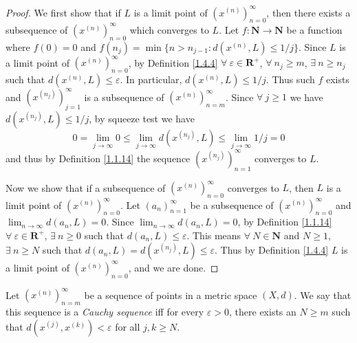 \begin{proof}
    We first show that if \(L\) is a limit point of \((x^{(n)})_{n = 0}^\infty\), then there exists a subsequence of \((x^{(n)})_{n = 0}^\infty\) which converges to \(L\).
    Let \(f : \mathbf{N} \to \mathbf{N}\) be a function where \(f(0) = 0\) and \(f(n_j) = \min\{n > n_{j - 1} : d(x^{(n)}, L) \leq 1 / j\}\).
    Since \(L\) is a limit point of \((x^{(n)})_{n = 0}^\infty\), by Definition \ref{1.4.4} \(\forall\ \varepsilon \in \mathbf{R}^+\), \(\forall\ n_j \geq m\), \(\exists\ n \geq n_j\) such that \(d(x^{(n)}, L) \leq \varepsilon\).
    In particular, \(d(x^{(n)}, L) \leq 1 / j\).
    Thus such \(f\) exists and \((x^{(n_j)})_{j = 1}^\infty\) is a subsequence of \((x^{(n)})_{n = m}^\infty\).
    Since \(\forall\ j \geq 1\) we have \(d(x^{(n_j)}, L) \leq 1 / j\), by squeeze test we have
    \[
        0 = \lim_{j \to \infty} 0 \leq \lim_{j \to \infty} d(x^{(n_j)}, L) \leq \lim_{j \to \infty} 1 / j = 0
    \]
    and thus by Definition \ref{1.1.14} the sequence \((x^{(n_j)})_{n = 1}^\infty\) converges to \(L\).

    Now we show that if a subsequence of \((x^{(n)})_{n = 0}^\infty\) converges to \(L\), then \(L\) is a limit point of \((x^{(n)})_{n = 0}^\infty\).
    Let \((a_n)_{n = 1}^\infty\) be a subsequence of \((x^{(n)})_{n = 0}^\infty\) and \(\lim_{n \to \infty} d(a_n, L) = 0\).
    Since \(\lim_{n \to \infty} d(a_n, L) = 0\), by Definition \ref{1.1.14} \(\forall\ \varepsilon \in \mathbf{R}^+\), \(\exists\ n \geq 0\) such that \(d(a_n, L) \leq \varepsilon\).
    This means \(\forall\ N \in \mathbf{N}\) and \(N \geq 1\), \(\exists\ n \geq N\) such that \(d(a_n, L) = d(x^{(n_j)}, L) \leq \varepsilon\).
    Thus by Definition \ref{1.4.4} \(L\) is a limit point of \((x^{(n)})_{n = 0}^\infty\), and we are done.
\end{proof}

\begin{definition}\label{1.4.6}
    Let \((x^{(n)})_{n = m}^\infty\) be a sequence of points in a metric space \((X, d)\).
    We say that this sequence is a \emph{Cauchy sequence} iff for every \(\varepsilon > 0\), there exists an \(N \geq m\) such that \(d(x^{(j)}, x^{(k)}) < \varepsilon\) for all \(j, k \geq N\).
\end{definition}